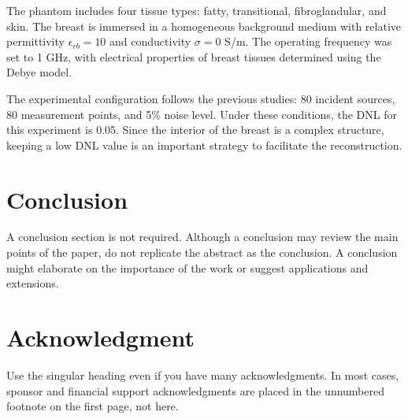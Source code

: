 \documentclass{IEEEtran}
\begin{document}
            The phantom includes four tissue types: fatty, transitional, fibroglandular, and skin. The breast is immersed in a homogeneous background medium with relative permittivity $\epsilon_{rb} = 10$ and conductivity $\sigma = 0$ S/m. The operating frequency was set to 1 GHz, with electrical properties of breast tissues determined using the Debye model.

            The experimental configuration follows the previous studies: 80 incident sources, 80 measurement points, and 5\% noise level. Under these conditions, the DNL for this experiment is 0.05. Since the interior of the breast is a complex structure, keeping a low DNL value is an important strategy to facilitate the reconstruction.

    \section{Conclusion}\label{sec:conclusion}
        A conclusion section is not required. Although a conclusion may review the main points of the paper, do not replicate the abstract as the conclusion. A  conclusion might elaborate on the importance of the work or suggest applications and extensions. \cite{chen2018computational}
    
    \appendices
    
    \section*{Acknowledgment}
    
        Use the singular heading even if you have many acknowledgments. In most  cases, sponsor and financial support acknowledgments are placed in the  unnumbered footnote on the first page, not here.
    
    
    
    
        
\end{document}
